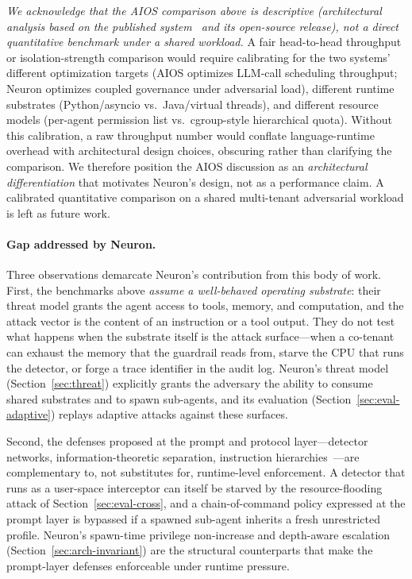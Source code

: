 \emph{We acknowledge that the AIOS comparison above is descriptive
(architectural analysis based on the published system~\cite{mei2025aios}
and its open-source release), not a direct quantitative benchmark
under a shared workload.} A fair head-to-head throughput or
isolation-strength comparison would require calibrating for the two
systems' different optimization targets (AIOS optimizes LLM-call
scheduling throughput; Neuron optimizes coupled governance under
adversarial load), different runtime substrates (Python/asyncio vs.\
Java/virtual threads), and different resource models (per-agent
permission list vs.\ cgroup-style hierarchical quota). Without this
calibration, a raw throughput number would conflate language-runtime
overhead with architectural design choices, obscuring rather than
clarifying the comparison. We therefore position the AIOS discussion
as an \emph{architectural differentiation} that motivates Neuron's
design, not as a performance claim. A calibrated quantitative
comparison on a shared multi-tenant adversarial workload is left as
future work.

\paragraph{Gap addressed by Neuron.}
Three observations demarcate Neuron's contribution from this body of work.
First, the benchmarks above \emph{assume a well-behaved operating
substrate}: their threat model grants the agent access to tools, memory,
and computation, and the attack vector is the content of an instruction or
a tool output. They do not test what happens when the substrate itself is
the attack surface---when a co-tenant can exhaust the memory that the
guardrail reads from, starve the CPU that runs the detector, or forge a
trace identifier in the audit log. Neuron's threat model
(Section~\ref{sec:threat}) explicitly grants the adversary the ability to
consume shared substrates and to spawn sub-agents, and its evaluation
(Section~\ref{sec:eval-adaptive}) replays adaptive attacks against these
surfaces.

Second, the defenses proposed at the prompt and protocol layer---detector
networks, information-theoretic separation, instruction
hierarchies~\cite{anthropic2024promptinjection,openai2024modelspec,bae2024defending}---are
complementary to, not substitutes for, runtime-level enforcement. A detector
that runs as a user-space interceptor can itself be starved by the
resource-flooding attack of Section~\ref{sec:eval-cross}, and a
chain-of-command policy expressed at the prompt layer is bypassed if a
spawned sub-agent inherits a fresh unrestricted profile. Neuron's
spawn-time privilege non-increase and depth-aware escalation
(Section~\ref{sec:arch-invariant}) are the structural counterparts that
make the prompt-layer defenses enforceable under runtime pressure.

